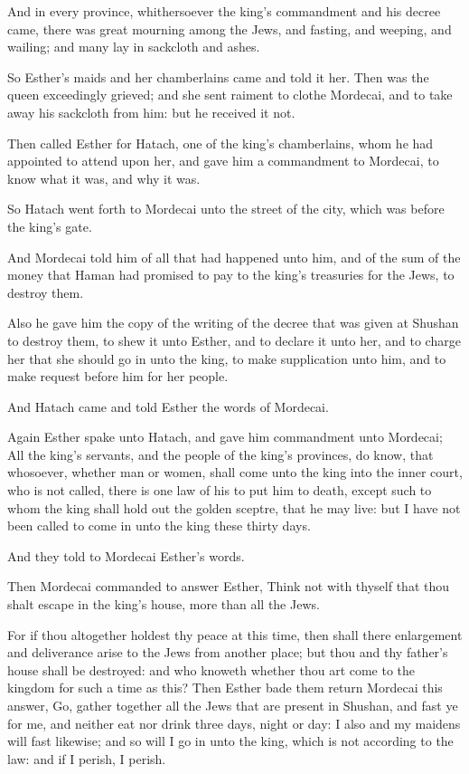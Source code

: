 \Verse And in every province, whithersoever the king's commandment and his decree came, there was great mourning among the Jews, and fasting, and weeping, and wailing; and many lay in sackcloth and ashes.

\Verse So Esther's maids and her chamberlains came and told it her. Then was the queen exceedingly grieved; and she sent raiment to clothe Mordecai, and to take away his sackcloth from him: but he received it not.

\Verse Then called Esther for Hatach, one of the king's chamberlains, whom he had appointed to attend upon her, and gave him a commandment to Mordecai, to know what it was, and why it was.

\Verse So Hatach went forth to Mordecai unto the street of the city, which was before the king's gate.

\Verse And Mordecai told him of all that had happened unto him, and of the sum of the money that Haman had promised to pay to the king's treasuries for the Jews, to destroy them.

\Verse Also he gave him the copy of the writing of the decree that was given at Shushan to destroy them, to shew it unto Esther, and to declare it unto her, and to charge her that she should go in unto the king, to make supplication unto him, and to make request before him for her people.

\Verse And Hatach came and told Esther the words of Mordecai.

\Verse Again Esther spake unto Hatach, and gave him commandment unto Mordecai; \Verse All the king's servants, and the people of the king's provinces, do know, that whosoever, whether man or women, shall come unto the king into the inner court, who is not called, there is one law of his to put him to death, except such to whom the king shall hold out the golden sceptre, that he may live: but I have not been called to come in unto the king these thirty days.

\Verse And they told to Mordecai Esther's words.

\Verse Then Mordecai commanded to answer Esther, Think not with thyself that thou shalt escape in the king's house, more than all the Jews.

\Verse For if thou altogether holdest thy peace at this time, then shall there enlargement and deliverance arise to the Jews from another place; but thou and thy father's house shall be destroyed: and who knoweth whether thou art come to the kingdom for such a time as this?  \Verse Then Esther bade them return Mordecai this answer, \Verse Go, gather together all the Jews that are present in Shushan, and fast ye for me, and neither eat nor drink three days, night or day: I also and my maidens will fast likewise; and so will I go in unto the king, which is not according to the law: and if I perish, I perish.

